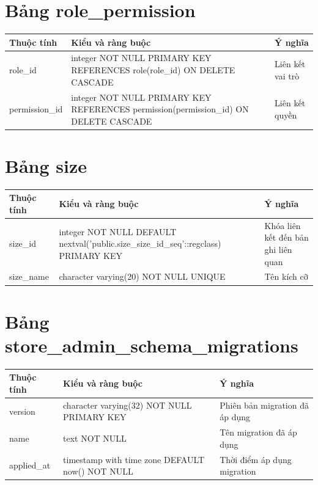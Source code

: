 \section{Bảng role\_permission}
\begin{longtable}{|p{}|p{}|p{}|}\hline
\textbf{Thuộc tính}&\textbf{Kiểu và ràng buộc}&\textbf{Ý nghĩa}\\\hline\endhead
role\_id & integer NOT NULL PRIMARY KEY REFERENCES role(role\_id) ON DELETE CASCADE & Liên kết vai trò\\\hline
permission\_id & integer NOT NULL PRIMARY KEY REFERENCES permission(permission\_id) ON DELETE CASCADE & Liên kết quyền\\\hline
\end{longtable}
\normalsize
\section{Bảng size}
\begin{longtable}{|p{}|p{}|p{}|}\hline
\textbf{Thuộc tính}&\textbf{Kiểu và ràng buộc}&\textbf{Ý nghĩa}\\\hline\endhead
size\_id & integer NOT NULL DEFAULT nextval('public.size\_size\_id\_seq'::regclass) PRIMARY KEY & Khóa liên kết đến bản ghi liên quan\\\hline
size\_name & character varying(20) NOT NULL UNIQUE & Tên kích cỡ\\\hline
\end{longtable}
\normalsize
\section{Bảng store\_admin\_schema\_migrations}
\begin{longtable}{|p{}|p{}|p{}|}\hline
\textbf{Thuộc tính}&\textbf{Kiểu và ràng buộc}&\textbf{Ý nghĩa}\\\hline\endhead
version & character varying(32) NOT NULL PRIMARY KEY & Phiên bản migration đã áp dụng\\\hline
name & text NOT NULL & Tên migration đã áp dụng\\\hline
applied\_at & timestamp with time zone DEFAULT now() NOT NULL & Thời điểm áp dụng migration\\\hline
\end{longtable}
\normalsize
